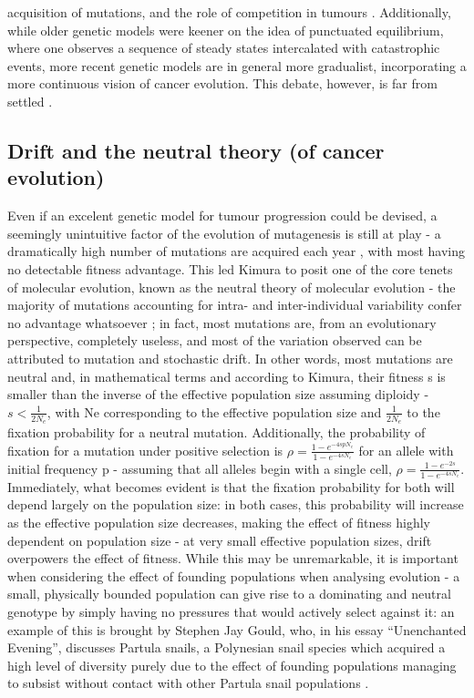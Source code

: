 acquisition of mutations, and the role of competition in tumours \cite{Cannataro2018-ye,Schwartz2017-hg}. Additionally, while older genetic models were keener on the idea of punctuated equilibrium, where one observes a sequence of steady states intercalated with catastrophic events, more recent genetic models are in general more gradualist, incorporating a more continuous vision of cancer evolution. This debate, however, is far from settled \cite{Beerenwinkel2015-xr,Sterelny2007-kp}.

\subsection{Drift and the neutral theory (of cancer evolution)}

Even if an excelent genetic model for tumour progression could be devised, a seemingly unintuitive factor of the evolution of mutagenesis is still at play - a dramatically high number of mutations are acquired each year \cite{Kimura1968-xd}, with most having no detectable fitness advantage. This led Kimura to posit one of the core tenets of molecular evolution, known as the neutral theory of molecular evolution - the majority of mutations accounting for intra- and inter-individual variability confer no advantage whatsoever \cite{Kimura1979-ps}; in fact, most mutations are, from an evolutionary perspective, completely useless, and most of the variation observed can be attributed to mutation and stochastic drift. In other words, most mutations are neutral and, in mathematical terms and according to Kimura, their fitness s is smaller than the inverse of the effective population size assuming diploidy - $s<\frac{1}{2N_e}$, with Ne corresponding to the effective population size and $\frac{1}{2N_e}$ to the fixation probability for a neutral mutation. Additionally, the probability of fixation for a mutation under positive selection is $\rho = \frac{1-e^{-4spN_e}}{1-e^{-4sN_e}}$ for an allele with initial frequency p \cite{Kimura1962-df} - assuming that all alleles begin with a single cell, $\rho = \frac{1-e^{-2s}}{1-e^{-4sN_e}}$. Immediately, what becomes evident is that the fixation probability for both will depend largely on the population size: in both cases, this probability will increase as the effective population size decreases, making the effect of fitness highly dependent on population size - at very small effective population sizes, drift overpowers the effect of fitness. While this may be unremarkable, it is important when considering the effect of founding populations when analysing evolution - a small, physically bounded population can give rise to a dominating and neutral genotype by simply having no pressures that would actively select against it: an example of this is brought by Stephen Jay Gould, who, in his essay “Unenchanted Evening”, discusses Partula snails, a Polynesian snail species which acquired a high level of diversity purely due to the effect of founding populations managing to subsist without contact with other Partula snail populations \cite{Gould1995-yr}.

